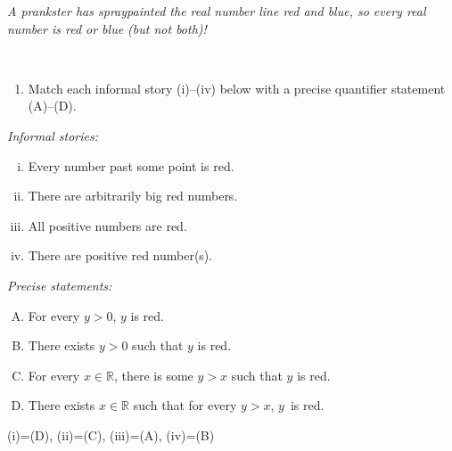 \documentclass[12pt]{amsart}
\newcommand{\R}{{\mathbb{R}}}
\numberwithin{equation}{section}
\theoremstyle{plain} %
\theoremstyle{definition}
\theoremstyle{remark}
\begin{document}
\noindent \textit{A prankster has spraypainted the real number line red and blue, so every real number is red or blue (but not both)!}

\

\begin{enumerate}
\item Match each informal story (i)--(iv) below with a precise quantifier statement (A)--(D). 
\end{enumerate}

\begin{minipage}[c]{0.4\linewidth}
\qquad \emph{Informal stories:}
\begin{enumerate}[(i)]
\item Every number past some point is red.


\item There are arbitrarily big red numbers.

\item All positive numbers are red.


\item There are positive red number(s).
\end{enumerate}
\end{minipage} %
\begin{minipage}[c]{0.6\linewidth}
\qquad \emph{Precise statements:}
\begin{enumerate}[(A)]
\item For every $y>0$, $y$ is red.

\item There exists $y>0$ such that $y$ is red.

\item For every $x\in \R$, there is some $y>x$ such that $y$ is red.

\item There exists $x\in \R$ such that for every $y>x$, $y$~is red.
\end{enumerate}
\end{minipage}


\begin{framed}
(i)=(D), (ii)=(C), (iii)=(A), (iv)=(B)
\end{framed}
\end{document}
